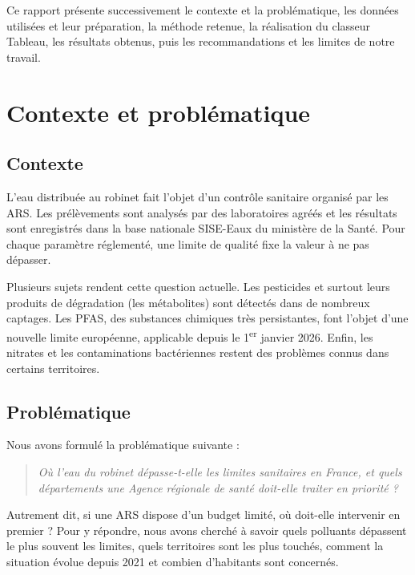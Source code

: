 \documentclass[11pt,a4paper]{article}
\begin{document}
Ce rapport présente successivement le contexte et la problématique, les données utilisées et leur préparation, la méthode retenue, la réalisation du classeur Tableau, les résultats obtenus, puis les recommandations et les limites de notre travail.

\section{Contexte et problématique}

\subsection{Contexte}

L'eau distribuée au robinet fait l'objet d'un contrôle sanitaire organisé par les ARS. Les prélèvements sont analysés par des laboratoires agréés et les résultats sont enregistrés dans la base nationale SISE-Eaux du ministère de la Santé. Pour chaque paramètre réglementé, une limite de qualité fixe la valeur à ne pas dépasser.

Plusieurs sujets rendent cette question actuelle. Les pesticides et surtout leurs produits de dégradation (les métabolites) sont détectés dans de nombreux captages. Les PFAS, des substances chimiques très persistantes, font l'objet d'une nouvelle limite européenne, applicable depuis le 1\textsuperscript{er} janvier 2026. Enfin, les nitrates et les contaminations bactériennes restent des problèmes connus dans certains territoires.

\subsection{Problématique}

Nous avons formulé la problématique suivante :

\begin{quote}
\textit{Où l'eau du robinet dépasse-t-elle les limites sanitaires en France, et quels départements une Agence régionale de santé doit-elle traiter en priorité ?}
\end{quote}

Autrement dit, si une ARS dispose d'un budget limité, où doit-elle intervenir en premier ? Pour y répondre, nous avons cherché à savoir quels polluants dépassent le plus souvent les limites, quels territoires sont les plus touchés, comment la situation évolue depuis 2021 et combien d'habitants sont concernés.
\end{document}
